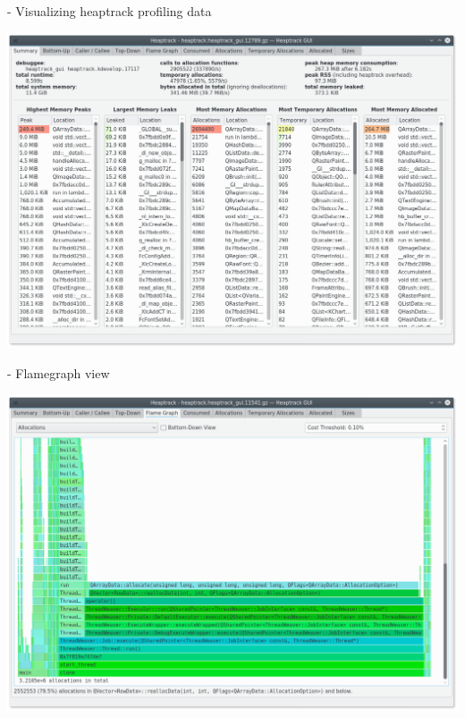 \begin{frame}{ - Visualizing heaptrack profiling data}
  \begin{center}
    \includegraphics[height=0.8\textheight]{slides/debugging-application-profiling/heaptrack_gui.png}
  \end{center}
\end{frame}

\begin{frame}{ - Flamegraph view}
  \begin{center}
    \includegraphics[height=0.8\textheight]{slides/debugging-application-profiling/heaptrack_gui_flamegraph.png}
  \end{center}
\end{frame}

